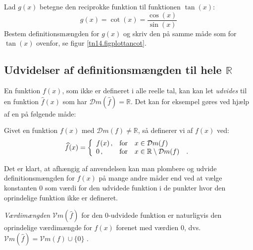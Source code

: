 \begin{exercise}
Lad $g(x)$ betegne den reciprokke funktion til funktionen $\tan(x)$:
\begin{equation}
g(x) = \cot(x) = \frac{\cos(x)}{\sin(x)}
\end{equation}
Bestem definitionsmængden for $g(x)$ og skriv den på samme måde som for $\tan(x)$ ovenfor, se figur \ref{tn14.figplottancot}.
\end{exercise}



\subsection{Udvidelser af definitionsmængden til hele $\mathbb{R}$}

En funktion $f(x)$, som ikke er defineret i alle reelle tal, kan kan let \emph{udvides} til en funktion $\widehat{f}(x)$ som  har $\mathcal{D}m(\widehat{f}) = \mathbb{R}$. Det kan for eksempel gøres ved hjælp af en  på følgende måde:

\begin{definition}
Givet en funktion $f(x)$ med $\mathcal{D}m(f) \neq \mathbb{R}$, så definerer vi  af $f(x)$ ved:
\begin{equation}
\widehat{f}(x) = \left\{
                      \begin{array}{ll}
                        f(x)\, , & \hbox{for} \quad x \in \mathcal{D}m(f)\\
                        0 \, , & \hbox{for} \quad  x \in \mathbb{R} \setminus \mathcal{D}m(f) \quad .
                      \end{array}
                    \right.
\end{equation}
\end{definition}

\begin{think}
Det er klart, at afhængig af anvendelsen kan man plombere og udvide definitionsmængden for $f(x)$ på mange andre måder end ved at vælge konstanten $0$ som værdi for den udvidede funktion i de punkter hvor den oprindelige funktion ikke er defineret.
\end{think}

\begin{aha}
\emph{Værdimængden} $\mathcal{V}m(\widehat{f})$ for den $0$-udvidede funktion er naturligvis den oprindelige værdimængde for $f(x)$ forenet med værdien $0$, dvs. $\mathcal{V}m(\widehat{f}) = \mathcal{V}m(f) \cup \{0\}$ .
\end{aha}


